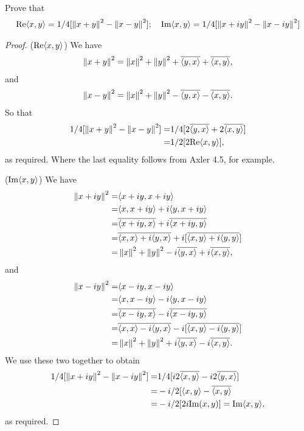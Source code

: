 \begin{exercise}{9}
Prove that
\begin{align*}
    \text{Re}\langle x,y\rangle = 1/4[\left\lVert x+y\right\rVert^2-\left\lVert x-y\right\rVert^2];\quad \text{Im}\langle x,y\rangle = 1/4[\left\lVert x+iy\right\rVert^2-\left\lVert x-iy\right\rVert^2]
\end{align*}
\end{exercise}
\begin{proof}
($\text{Re}\langle x,y\rangle$)
We have 
\begin{align*}
    \left\lVert x+y\right\rVert^2 = \left\lVert x\right\rVert^2 +\left\lVert y\right\rVert^2 + \overline{\langle y,x\rangle} + \overline{\langle x,y\rangle},
\end{align*}
and
\begin{align*}
    \left\lVert x-y\right\rVert^2 = 
    \left\lVert x\right\rVert^2 +\left\lVert y\right\rVert^2 -\overline{\langle y,x\rangle} - \overline{\langle x,y\rangle}.
\end{align*}
So that
\begin{align*}
    1/4[\left\lVert x+y\right\rVert^2 -\left\lVert x-y\right\rVert^2]
    =& 1/4[2\overline{\langle y,x\rangle} + 2\overline{\langle x,y\rangle}]\\
    =& 1/2[2\text{Re}\langle x,y\rangle],
\end{align*}
as required.
Where the last equality follows from Axler 4.5, for example.

($\text{Im}\langle x,y\rangle$)
We have
\begin{align*}
    \left\lVert x+iy\right\rVert^2
    =& \langle x+iy, x+iy\rangle\\
    =& \langle x,x+iy\rangle + i\langle y,x+iy\rangle\\
    =& \overline{\langle x+iy,x\rangle} +i\overline{\langle x+iy,y\rangle}\\
    =& \overline{\langle x,x\rangle + i\langle y,x\rangle} + i[\overline{\langle x,y\rangle + i\langle y,y\rangle}]\\
    =& \left\lVert x\right\rVert^2 + \left\lVert y\right\rVert^2 - i\overline{\langle y,x\rangle} + i\overline{\langle x,y\rangle},
\end{align*}
and
\begin{align*}
    \left\lVert x-iy\right\rVert^2
    =& \langle x-iy, x-iy\rangle\\
    =& \langle x,x-iy\rangle - i\langle y,x-iy\rangle\\
    =& \overline{\langle x-iy,x\rangle} -i\overline{\langle x-iy,y\rangle}\\
    =& \overline{\langle x,x\rangle - i\langle y,x\rangle} - i[\overline{\langle x,y\rangle - i\langle y,y\rangle}]\\
    =& \left\lVert x\right\rVert^2 + \left\lVert y\right\rVert^2 + i\overline{\langle y,x\rangle} - i\overline{\langle x,y\rangle}.
\end{align*}
We use these two together to obtain
\begin{align*}
    1/4[\left\lVert x+iy\right\rVert^2-\left\lVert x-iy\right\rVert^2]
    =& 1/4[i2\overline{\langle x,y\rangle} -i2\overline{\langle y,x\rangle}]\\
    =& -i/2[\langle x,y\rangle-\overline{\langle x,y\rangle}\\
    =& -i/2[2i\text{Im}(x,y)] = \text{Im}\langle x,y\rangle,
\end{align*}
as required.
\end{proof}


